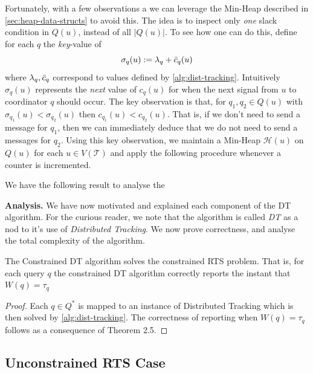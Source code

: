 Fortunately, with a few observations a we can leverage the Min-Heap described in \cref{sec:heap-data-structs} to avoid this. The idea is to inspect only \textit{one} slack condition in $Q(u)$, instead of all $|Q(u)|$. To see how one can do this, define for each $q$ the \textit{key}-value of 
\begin{equation}
    \sigma_q(u) := \lambda_q + \Bar{c}_q(u)
\end{equation}
where $\lambda_q, \Bar{c}_q$ correspond to values defined by \cref{alg:dist-tracking}. Intuitively $\sigma_q(u)$ represents the \textit{next} value of $c_q(u)$ for when the next signal from $u$ to coordinator $q$ should occur. The key observation is that, for $q_1, q_2 \in Q(u)$ with $\sigma_{q_{1}}(u) < \sigma_{q_{2}}(u)$ then $c_{q_1}(u) < c_{q_2}(u)$. That is, if we don't need to send a message for $q_1$, then we can immediately deduce that we do not need to send a messages for $q_2$. Using this key observation, we maintain a Min-Heap $\mathcal{H}(u)$ on $Q(u)$ for each $u\in V(\mathcal{T})$ and apply the following procedure whenever a counter is incremented.

\begin{algorithm}
\begin{algorithmic}[1]
\State {}
\State {}
\State {}
\Statex {}
\Statex {}
\EndProcedure
\end{algorithmic}
\end{algorithm}

We have the following result to analyse the 


\textbf{Analysis.} We have now motivated and explained each component of the DT algorithm. For the curious reader, we note that the algorithm is called \textit{DT} as a nod to it's use of \textit{Distributed Tracking}. We now prove correctness, and analyse the total complexity of the algorithm.

\begin{theorem}[Correctness] The Constrained DT algorithm solves the constrained RTS problem. That is, for each query $q$ the constrained DT algorithm correctly reports the instant that $W(q) = \tau_q$
\end{theorem}
\begin{proof}
    Each $q \in Q^*$ is mapped to an instance of Distributed Tracking which is then solved by \cref{alg:dist-tracking}. The correctness of reporting when $W(q) = \tau_q$ follows as a consequence of Theorem 2.5.
\end{proof}

\begin{theorem}
\end{theorem}


\subsection{Unconstrained RTS Case}